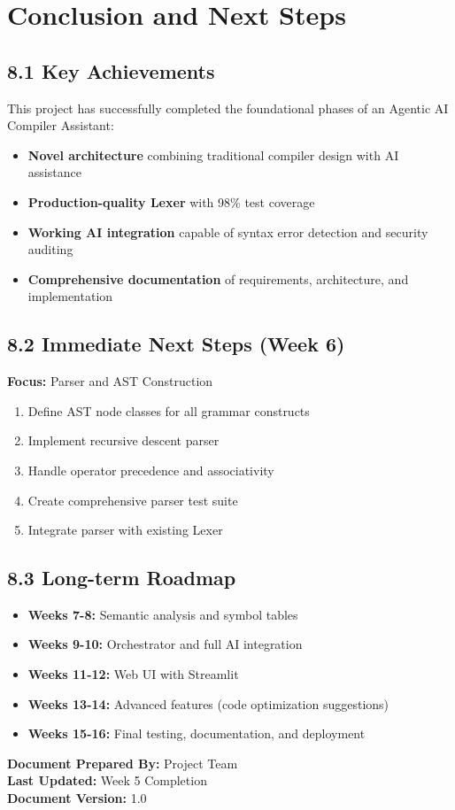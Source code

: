 \documentclass[a4paper,11pt]{article}
\begin{document}
\section{Conclusion and Next Steps}

\subsection{8.1 Key Achievements}

This project has successfully completed the foundational phases of an Agentic AI Compiler Assistant:
\begin{itemize}
    \item \textbf{Novel architecture} combining traditional compiler design with AI assistance
    \item \textbf{Production-quality Lexer} with 98\% test coverage
    \item \textbf{Working AI integration} capable of syntax error detection and security auditing
    \item \textbf{Comprehensive documentation} of requirements, architecture, and implementation
\end{itemize}

\subsection{8.2 Immediate Next Steps (Week 6)}

\textbf{Focus:} Parser and AST Construction
\begin{enumerate}
    \item Define AST node classes for all grammar constructs
    \item Implement recursive descent parser
    \item Handle operator precedence and associativity
    \item Create comprehensive parser test suite
    \item Integrate parser with existing Lexer
\end{enumerate}

\subsection{8.3 Long-term Roadmap}

\begin{itemize}
    \item \textbf{Weeks 7-8:} Semantic analysis and symbol tables
    \item \textbf{Weeks 9-10:} Orchestrator and full AI integration
    \item \textbf{Weeks 11-12:} Web UI with Streamlit
    \item \textbf{Weeks 13-14:} Advanced features (code optimization suggestions)
    \item \textbf{Weeks 15-16:} Final testing, documentation, and deployment
\end{itemize}

\vspace{10mm}
\noindent\textbf{Document Prepared By:} Project Team \\
\textbf{Last Updated:} Week 5 Completion \\
\textbf{Document Version:} 1.0
\end{document}
